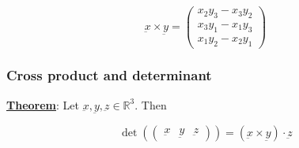 \documentclass[10pt]{extarticle}
\newcommand{\R}{\mathbb{R}}
\begin{document}
$$
    \underbar{x} \times \underbar{y} = \begin{pmatrix}
        x_2 y_3 - x_3 y_2 \\
        x_3 y_1 - x_1 y_3 \\
        x_1 y_2 - x_2 y_1
    \end{pmatrix}
$$

\subsubsection{Cross product and determinant}

\textbf{\underline{Theorem}}: Let $\underbar{x}, \underbar{y}, \underbar{z} \in \R^3$. Then

$$
    \det \left( \begin{pmatrix}
            \underbar{x} & \underbar{y} & \underbar{z}
        \end{pmatrix} \right) = (\underbar{x} \times \underbar{y}) \cdot \underbar{z}
$$
\end{document}

